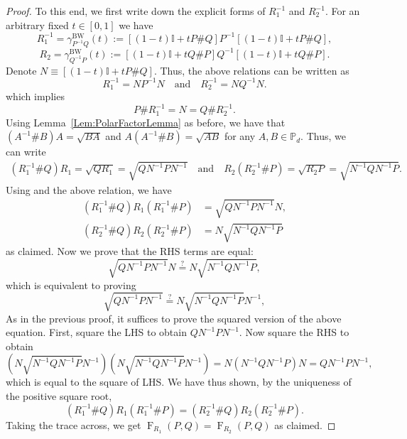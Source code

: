 \documentclass[12pt]{article}
\theoremstyle{definition}
\newcommand{\iseq}{\overset{?}{=}}
\begin{document}
\begin{proof}
To this end, we first write down the explicit forms of $R_1 ^{-1} $ and $R_2 ^{-1} $. For an arbitrary fixed $t \in [0,1]$ we have
\begin{equation}
R_1 ^{-1}  = \gamma_{P ^{-1}  Q}^{\mathrm{BW}}(t) := \left[(1-t)\mathbb{I} + t P \# Q\right] P ^{-1}  \left[(1-t)\mathbb{I} + t P \# Q\right],
\end{equation}
\begin{equation}
R_2 = \gamma_{Q ^{-1} P}^{\mathrm{BW}}(t) := \left[(1-t)\mathbb{I} + t Q \# P\right] Q ^{-1}  \left[(1-t)\mathbb{I} + t Q\# P\right].
\end{equation}
Denote $N \equiv \left[(1-t)\mathbb{I} + t P \# Q\right]$. Thus, the above relations can be written as
\begin{equation}
R_1 ^{-1}  = N P^{-1}  N \quad \text{and} \quad R_2 ^{-1}  = N Q ^{-1} N.
\end{equation}
which implies
\begin{equation}
P \# R_1 ^{-1} = N = Q \# R_2 ^{-1}.  \label{Eq:69}
 \end{equation}
Using Lemma~\ref{Lem:PolarFactorLemma} as before, we have that $(A^{-1} \# B)A = \sqrt{BA}$ and $A (A^{-1} \# B)= \sqrt{A B}$ for any $A, B \in \mathbb P_d$. Thus, we can write
\begin{align}
(R_1^{-1} \# Q) R_1 = \sqrt{Q R_1} = \sqrt{Q N ^{-1} P N ^{-1} } \quad \text{and} \quad R_2 (R_2 ^{-1} \# P) = \sqrt{R_2 P} = \sqrt{N ^{-1} Q N ^{-1}  P}.
\end{align}
Using  and the above relation, we have
\begin{align}
    (R_1^{-1} \# Q)  R_1 (R_1^{-1} \# P) &= \sqrt{Q N ^{-1}  P  N ^{-1} } N, \\
    (R_2^{-1} \# Q)  R_2 (R_2^{-1} \# P) &= N \sqrt{N ^{-1}  Q N ^{-1}  P}
\end{align}
as claimed. Now we prove that the RHS terms are equal:
\begin{equation}
    \sqrt{Q N ^{-1}  P N ^{-1} } N  \iseq N  \sqrt{N ^{-1}  Q N ^{-1}  P},
\end{equation}
which is equivalent to proving
\begin{equation}
    \sqrt{Q N ^{-1}  P N ^{-1} }   \iseq N  \sqrt{N ^{-1}  Q N ^{-1}  P} N ^{-1} ,
\end{equation}
As in the previous proof, it suffices to prove the squared version of the above equation. First, square the LHS to obtain $Q N ^{-1}  P N ^{-1} $. Now square the RHS to obtain
\begin{equation}
\left(N  \sqrt{N ^{-1}  Q N ^{-1}  P} N ^{-1}\right) \left(N  \sqrt{N ^{-1}  Q N ^{-1}  P} N ^{-1} \right) = N (N ^{-1}  Q N ^{-1}  P) N = Q N ^{-1}  P N ^{-1} ,
\end{equation}
which is equal to the square of LHS. We have thus shown, by the uniqueness of the positive square root,
\begin{equation}
(R_1^{-1} \# Q) R_1 (R_1^{-1} \# P) = (R_2^{-1} \# Q) R_2 (R_2^{-1} \# P).
\end{equation}
Taking the trace across, we get $\operatorname{F}_{R_1}(P,Q) = \operatorname{F}_{R_2}(P,Q)$ as claimed.
\end{proof}
\end{document}
